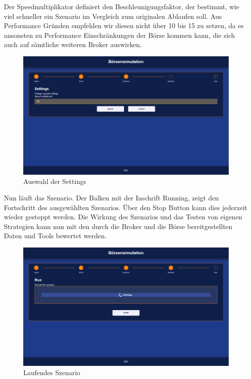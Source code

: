 Der Speedmultiplikator definiert den Beschleunigungsfaktor, der bestimmt, wie viel schneller ein Szenario im Vergleich zum originalen Ablaufen soll. Aus Performance Gründen empfehlen wir diesen nicht über 10 bis 15 zu setzen, da es ansonsten zu Performance Einschränkungen der Börse kommen kann, die sich auch auf sämtliche weiteren Broker auswirken.
\begin{figure}[ht]
	\includegraphics[width=\textwidth]{img/Settings.png}
	\centering
	\caption{Auswahl der Settings}
	\label{fig:settings}
\end{figure}

Nun läuft das Szenario. Der Balken mit der Inschrift Running, zeigt den Fortschritt des ausgewählten Szenarios. Über den Stop Button kann dies jederzeit wieder gestoppt werden. Die Wirkung des Szenarios und das Testen von eigenen Strategien kann nun mit den durch die Broker und die Börse bereitgestellten Daten und Tools bewertet werden. 
\begin{figure}[ht]
	\includegraphics[width=\textwidth]{img/Run.png}
	\centering
	\caption{Laufendes Szenario}
	\label{fig:run}
\end{figure}